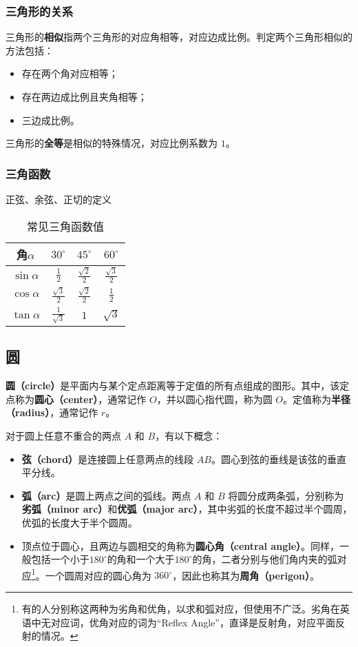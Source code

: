 \subsubsection{三角形的关系}

三角形的\textbf{相似}指两个三角形的对应角相等，对应边成比例。判定两个三角形相似的方法包括：
\begin{itemize}
\item 存在两个角对应相等；
\item 存在两边成比例且夹角相等；
\item 三边成比例。
\end{itemize}

三角形的\textbf{全等}是相似的特殊情况，对应比例系数为 $1$。

\subsubsection{三角函数}

正弦、余弦、正切的定义

\begin{table}[ht]
\centering
\caption{常见三角函数值}\label{tab_HsGeBa1}
\begin{tabular}{|c|c|c|c|}
\hline
角$\alpha$ & $30^{\circ}$ & $45^{\circ}$ & $60^{\circ}$ \\
\hline
$\sin\alpha$ & $\displaystyle\frac{1}{2}$ & $\displaystyle\frac{\sqrt{2}}{2}$ & $\displaystyle\frac{\sqrt{3}}{2}$ \\
\hline
$\cos\alpha$ & $\displaystyle\frac{\sqrt{3}}{2}$& $\displaystyle\frac{\sqrt{2}}{2}$ &  $\displaystyle\frac{1}{2}$ \\
\hline
$\tan\alpha$ & $\displaystyle\frac{1}{\sqrt{3}}$ & $1$ & $\sqrt{3}$ \\
\hline
\end{tabular}
\end{table}
\subsection{圆}\label{sub_HsGeBa_1}

\textbf{圆（circle）}是平面内与某个定点距离等于定值的所有点组成的图形。其中，该定点称为\textbf{圆心（center）}，通常记作 $O$，并以圆心指代圆，称为圆 $O$。定值称为\textbf{半径（radius）}，通常记作 $r$。

对于圆上任意不重合的两点 $A$ 和 $B$，有以下概念：
\begin{itemize}
\item \textbf{弦（chord）}是连接圆上任意两点的线段 $AB$。圆心到弦的垂线是该弦的垂直平分线。
\item \textbf{弧（arc）}是圆上两点之间的弧线。两点 $A$ 和 $B$ 将圆分成两条弧，分别称为\textbf{劣弧（minor arc）}和\textbf{优弧（major arc）}，其中劣弧的长度不超过半个圆周，优弧的长度大于半个圆周。
\item 顶点位于圆心，且两边与圆相交的角称为\textbf{圆心角（central angle）}。同样，一般包括一个小于$180^\circ$的角和一个大于$180^\circ$的角，二者分别与他们角内夹的弧对应\footnote{有的人分别称这两种为劣角和优角，以求和弧对应，但使用不广泛。劣角在英语中无对应词，优角对应的词为“Reflex Angle”，直译是反射角，对应平面反射的情况。}。一个圆周对应的圆心角为 $360^\circ$，因此也称其为\textbf{周角（perigon）}。
\end{itemize}

